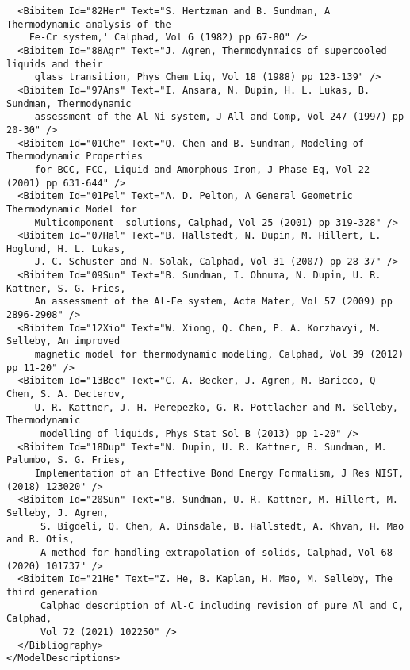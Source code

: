 \documentclass[preprint,review,12pt]{elsarticle}
\begin{document}
\begin{appendix}
{\begin{verbatim}
  <Bibitem Id="82Her" Text="S. Hertzman and B. Sundman, A Thermodynamic analysis of the 
    Fe-Cr system,' Calphad, Vol 6 (1982) pp 67-80" />
  <Bibitem Id="88Agr" Text="J. Agren, Thermodynmaics of supercooled liquids and their
     glass transition, Phys Chem Liq, Vol 18 (1988) pp 123-139" />
  <Bibitem Id="97Ans" Text="I. Ansara, N. Dupin, H. L. Lukas, B. Sundman, Thermodynamic
     assessment of the Al-Ni system, J All and Comp, Vol 247 (1997) pp 20-30" />
  <Bibitem Id="01Che" Text="Q. Chen and B. Sundman, Modeling of Thermodynamic Properties 
     for BCC, FCC, Liquid and Amorphous Iron, J Phase Eq, Vol 22 (2001) pp 631-644" />
  <Bibitem Id="01Pel" Text="A. D. Pelton, A General Geometric Thermodynamic Model for 
     Multicomponent  solutions, Calphad, Vol 25 (2001) pp 319-328" />
  <Bibitem Id="07Hal" Text="B. Hallstedt, N. Dupin, M. Hillert, L. Hoglund, H. L. Lukas, 
     J. C. Schuster and N. Solak, Calphad, Vol 31 (2007) pp 28-37" />
  <Bibitem Id="09Sun" Text="B. Sundman, I. Ohnuma, N. Dupin, U. R. Kattner, S. G. Fries, 
     An assessment of the Al-Fe system, Acta Mater, Vol 57 (2009) pp 2896-2908" />
  <Bibitem Id="12Xio" Text="W. Xiong, Q. Chen, P. A. Korzhavyi, M. Selleby, An improved 
     magnetic model for thermodynamic modeling, Calphad, Vol 39 (2012) pp 11-20" />
  <Bibitem Id="13Bec" Text="C. A. Becker, J. Agren, M. Baricco, Q Chen, S. A. Decterov, 
     U. R. Kattner, J. H. Perepezko, G. R. Pottlacher and M. Selleby, Thermodynamic 
      modelling of liquids, Phys Stat Sol B (2013) pp 1-20" />
  <Bibitem Id="18Dup" Text="N. Dupin, U. R. Kattner, B. Sundman, M. Palumbo, S. G. Fries, 
     Implementation of an Effective Bond Energy Formalism, J Res NIST, (2018) 123020" />
  <Bibitem Id="20Sun" Text="B. Sundman, U. R. Kattner, M. Hillert, M. Selleby, J. Agren, 
      S. Bigdeli, Q. Chen, A. Dinsdale, B. Hallstedt, A. Khvan, H. Mao and R. Otis, 
      A method for handling extrapolation of solids, Calphad, Vol 68 (2020) 101737" />
  <Bibitem Id="21He" Text="Z. He, B. Kaplan, H. Mao, M. Selleby, The third generation
      Calphad description of Al-C including revision of pure Al and C, Calphad,
      Vol 72 (2021) 102250" />
  </Bibliography>
</ModelDescriptions>

\end{verbatim}
}

\end{appendix}
\end{document}
